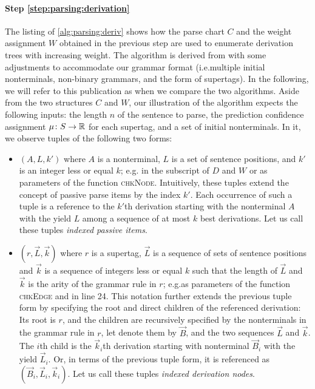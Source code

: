 \documentclass[../../document.tex]{subfiles}
\begin{document}
    \paragraph{Step \ref{step:parsing:derivation}}
    The listing of \cref{alg:parsing:deriv} shows how the parse chart \(C\) and the weight assignment \(W\) obtained in the previous step are used to enumerate derivation trees with increasing weight.
    The algorithm is derived from \citet[Algorithms~2, 3 and 4]{HuaChia05} with some adjustments to accommodate our grammar format (i.e.\@ multiple initial nonterminals, non-binary grammars, and the form of  supertags).
    In the following, we will refer to this publication as  when we compare the two algorithms.
    Aside from the two structures \(C\) and \(W\), our illustration of the algorithm expects the following inputs: the length \(n\) of the sentence to parse, the prediction confidence assignment \(\mu\colon S \to \mathbb{R}\) for each supertag, and a set of initial nonterminals.
    In it, we observe tuples of the following two forms:
    \begin{itemize}
        \item
            \((A, L, k')\) where \(A\) is a nonterminal, \(L\) is a set of sentence positions, and \(k'\) is an integer less or equal \(k\); e.g. in the subscript of \(D\) and \(W\) or as parameters of the function \textsc{chkNode}.
            Intuitively, these tuples extend the concept of passive parse items by the index \(k'\).
            Each occurrence of such a tuple is a reference to the \(k'\)th derivation starting with the nonterminal \(A\) with the yield \(L\) among a sequence of at most \(k\) best derivations.
            Let us call these tuples \emph{indexed passive items}.
        \item
            \((r, \vec{L}, \vec{k})\) where \(r\) is a supertag, \(\vec{L}\) is a sequence of sets of sentence positions and \(\vec{k}\) is a sequence of integers less or equal \(k\) such that the length of \(\vec{L}\) and \(\vec{k}\) is the arity of the grammar rule in \(r\); e.g.\@ as parameters of the function \textsc{chkEdge} and in line 24.
            This notation further extends the previous tuple form by specifying the root and direct children of the referenced derivation:
                Its root is \(r\), and the children are recursively specified by the  nonterminals in the grammar rule in \(r\), let denote them by \(\vec{B}\), and the two sequences \(\vec{L}\) and \(\vec{k}\).
                The \(i\)th child is the \(\vec{k}_i\)th derivation starting with nonterminal \(\vec{B}_i\) with the yield \(\vec{L}_i\).
                Or, in terms of the previous tuple form, it is referenced as \((\vec{B}_i, \vec{L}_i, \vec{k}_i)\).
            Let us call these tuples \emph{indexed derivation nodes}.
    \end{itemize}
\end{document}
